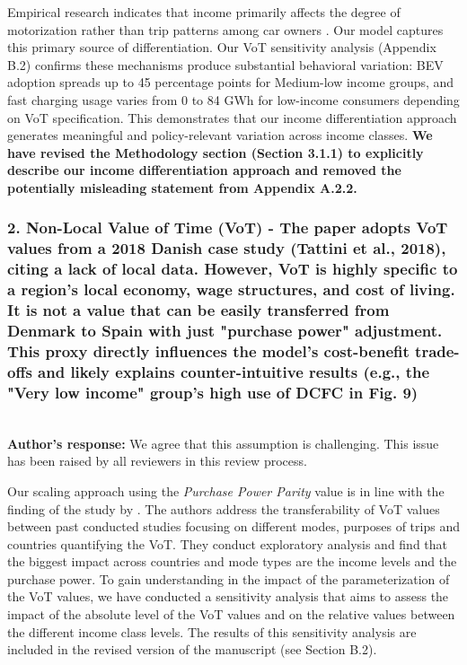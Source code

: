 \documentclass[11pt]{article}
\begin{document}
Empirical research indicates that income primarily affects the degree of motorization rather than trip patterns among car owners \citep{tikoudis2024oecd246, CHATTERTON201830}. Our model captures this primary source of differentiation.
Our VoT sensitivity analysis (Appendix B.2) confirms these mechanisms produce substantial behavioral variation: BEV adoption spreads up to 45 percentage points for Medium-low income groups, and fast charging usage varies from 0 to 84 GWh for low-income consumers depending on VoT specification. This demonstrates that our income differentiation approach generates meaningful and policy-relevant variation across income classes.
\textbf{We have revised the Methodology section (Section 3.1.1) to explicitly describe our income differentiation approach and removed the potentially misleading statement from Appendix A.2.2.}

\color{reviewergrey}
\subsubsection*{2. Non-Local Value of Time (VoT) - The paper adopts VoT values from a 2018 Danish case study (Tattini et al., 2018), citing a lack of local data. However, VoT is highly specific to a region's local economy, wage structures, and cost of living. It is not a value that can be easily transferred from Denmark to Spain with just "purchase power" adjustment. This proxy directly influences the model's cost-benefit trade-offs and likely explains counter-intuitive results (e.g., the "Very low income" group's high use of DCFC in Fig. 9)} \\
\color{authorblue} \noindent \textcolor{authorblue}{\textbf{Author's response:}} We agree that this assumption is challenging. This issue has been raised by all reviewers in this review process. 

Our scaling approach using the \textit{Purchase Power Parity} value is in line with the finding of the study by \citet{WARDMAN201693}. The authors address the transferability of VoT values between past conducted studies focusing on different modes, purposes of trips and countries quantifying the VoT. They conduct exploratory analysis and find that the biggest impact across countries and mode types are the income levels and the purchase power. To gain understanding in the impact of the parameterization of the VoT values, we have conducted a sensitivity analysis that aims to assess the impact of the absolute level of the VoT values and on the relative values between the different income class levels. The results of this sensitivity analysis are included in the revised version of the manuscript (see Section B.2).
\end{document}
